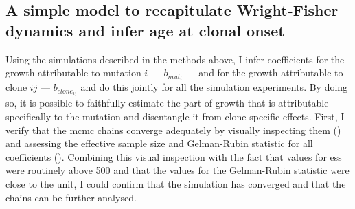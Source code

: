 \begin{figure}[!h]
	\label{fig:truq-data}
\end{figure}

\begin{figure}[!h]
	\label{fig:replicate-data}
\end{figure}

\begin{figure}
	\label{fig:overdispersion-chains}
\end{figure}

\begin{figure}
	\label{fig:overdispersion-longitudinal}
\end{figure}

\subsection{A simple model to recapitulate Wright-Fisher dynamics and infer age at clonal onset}

Using the simulations described in the methods above, I infer coefficients for the growth attributable to mutation $i$ --- $b_{mut_i}$ --- and for the growth attributable to clone $ij$ --- $b_{clone_{ij}}$ and do this jointly for all the simulation experiments. By doing so, it is possible to faithfully estimate the part of growth that is attributable specifically to the mutation and disentangle it from clone-specific effects. First, I verify that the \ac{mcmc} chains converge adequately by visually inspecting them () and assessing the effective sample size and Gelman-Rubin statistic for all coefficients (). Combining this visual inspection with the fact that values for \ac{ess} were routinely above 500 and that the values for the Gelman-Rubin statistic were close to the unit, I could confirm that the simulation has converged and that the chains can be further analysed. 

